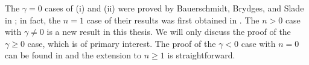 The $\gamma = 0$ cases of (i) and (ii) were proved by Bauerschmidt, Brydges,
and Slade in \cite{BBS-saw4,BBS-saw4-log};
in fact, the $n = 1$ case of their results was first obtained in
\cite{Hara87,HT87,GK85,FMRS87}.
The $n > 0$ case with $\gamma \ne 0$ is a new result in this thesis. We
will only discuss the proof of the $\gamma \ge 0$ case, which is of primary
interest. The proof of the $\gamma < 0$ case with $n = 0$ can be found in
\cite{BSW-saw-sa} and the extension to $n \ge 1$ is straightforward.